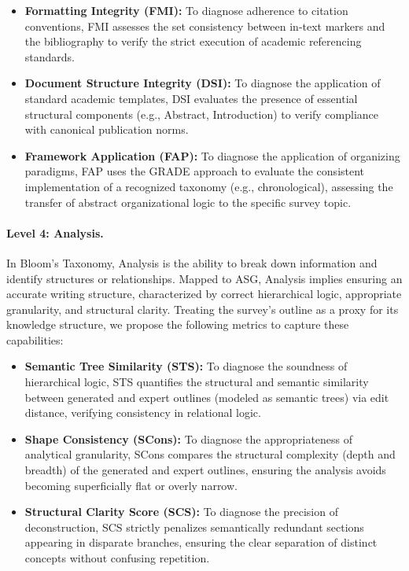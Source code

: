 \documentclass[11pt]{article}
\begin{document}
\begin{itemize}[leftmargin=0.2cm, itemsep=0pt, parsep=0pt]
\item \textbf{Formatting Integrity (FMI):} To diagnose adherence to citation conventions, FMI assesses the set consistency between in-text markers and the bibliography to verify the strict execution of academic referencing standards.

\item \textbf{Document Structure Integrity (DSI):} To diagnose the application of standard academic templates, DSI evaluates the presence of essential structural components (e.g., Abstract, Introduction) to verify compliance with canonical publication norms.

\item \textbf{Framework Application (FAP):} To diagnose the application of organizing paradigms, FAP uses the GRADE approach to evaluate the consistent implementation of a recognized taxonomy (e.g., chronological), assessing the transfer of abstract organizational logic to the specific survey topic.
\end{itemize}


\paragraph{Level 4: Analysis.}
\label{sec:l4_analysis}
In Bloom's Taxonomy, Analysis is the ability to break down information and identify structures or relationships. Mapped to ASG, Analysis implies ensuring an accurate writing structure, characterized by correct hierarchical logic, appropriate granularity, and structural clarity. Treating the survey's outline as a proxy for its knowledge structure, we propose the following metrics to capture these capabilities:

\begin{itemize}[leftmargin=0.2cm, itemsep=0pt, parsep=0pt]

\item \textbf{Semantic Tree Similarity (STS):} To diagnose the soundness of hierarchical logic, STS quantifies the structural and semantic similarity between generated and expert outlines (modeled as semantic trees) via edit distance, verifying consistency in relational logic.

\item \textbf{Shape Consistency (SCons):} To diagnose the appropriateness of analytical granularity, SCons compares the structural complexity (depth and breadth) of the generated and expert outlines, ensuring the analysis avoids becoming superficially flat or overly narrow.

\item \textbf{Structural Clarity Score (SCS):} To diagnose the precision of deconstruction, SCS strictly penalizes semantically redundant sections appearing in disparate branches, ensuring the clear separation of distinct concepts without confusing repetition.
\end{itemize}
\end{document}
